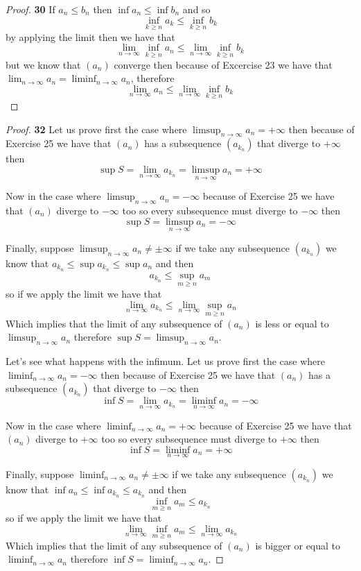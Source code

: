 \documentclass[11pt]{article}
\theoremstyle{definition}
\begin{document}
    \begin{proof}{\textbf{30}}
        If $a_n \leq b_n$ then $\inf a_n \leq \inf b_n$ and so
        $$\inf_{k \geq n}a_k \leq \inf_{k\geq n} b_k$$
        by applying the limit then we have that 
        $$\lim_{n\to\infty}\inf_{k \geq n} a_n \leq \lim_{n\to\infty}\inf_{k\geq n} b_k$$
        but we know that $(a_n)$ converge then because of Excercise 23 we have that
        $\lim_{n\to\infty} a_n = \liminf_{n\to\infty} a_n$, therefore
        $$\lim_{n\to\infty} a_n \leq \lim_{n\to\infty}\inf_{k\geq n} b_k$$
    \end{proof}
\cleardoublepage
    \begin{proof}{\textbf{32}}
        Let us prove first the case where $\limsup_{n\to\infty} a_n = +\infty$ then
        because of Exercise 25 we have that $(a_n)$ has a subsequence $(a_{k_n})$
        that diverge to $+\infty$ then 
        $$\sup S = \lim_{n\to\infty} a_{k_n} = \limsup_{n\to\infty} a_n = +\infty$$
        
        Now in the case where $\limsup_{n\to\infty} a_n = -\infty$
        because of Exercise 25 we have that $(a_n)$ diverge to $-\infty$ too so 
        every subsequence must diverge to $-\infty$ then
        $$\sup S = \limsup_{n\to\infty} a_n = -\infty$$
        
        Finally, suppose $\limsup_{n\to\infty} a_n \neq \pm\infty$ if we take any subsequence
        $(a_{k_n})$ we know that $a_{k_n} \leq \sup a_{k_n} \leq \sup a_n$  and then
        $$a_{k_n} \leq \sup_{m\geq n} a_m$$
        so if we apply the limit we have that
        $$\lim_{n \to \infty} a_{k_n} \leq \lim_{n \to \infty} \sup_{m\geq n} a_n$$
        Which implies that the limit of any subsequence of $(a_n)$ is less or equal to
        $\limsup_{n \to \infty} a_n$ therefore $\sup S = \limsup_{n \to \infty} a_n$.

        Let's see what happens with the infimum.
        Let us prove first the case where $\liminf_{n\to\infty} a_n = -\infty$ then
        because of Exercise 25 we have that $(a_n)$ has a subsequence $(a_{k_n})$
        that diverge to $-\infty$ then 
        $$\inf S = \lim_{n\to\infty} a_{k_n} = \liminf_{n\to\infty} a_n = -\infty$$
        
        Now in the case where $\liminf_{n\to\infty} a_n = +\infty$
        because of Exercise 25 we have that $(a_n)$ diverge to $+\infty$ too so 
        every subsequence must diverge to $+\infty$ then
        $$\inf S = \liminf_{n\to\infty} a_n = +\infty$$
        
        Finally, suppose $\liminf_{n\to\infty} a_n \neq \pm\infty$ if we take any subsequence
        $(a_{k_n})$ we know that $\inf a_n \leq \inf a_{k_n} \leq a_{k_n}$  and then
        $$\inf_{m\geq n} a_m \leq a_{k_n}$$
        so if we apply the limit we have that
        $$\lim_{n \to \infty} \inf_{m\geq n} a_m \leq \lim_{n \to \infty} a_{k_n}$$
        Which implies that the limit of any subsequence of $(a_n)$ is bigger or equal
        to $\liminf_{n \to \infty} a_n$ therefore $\inf S = \liminf_{n \to \infty} a_n$.
    \end{proof}
\end{document}
